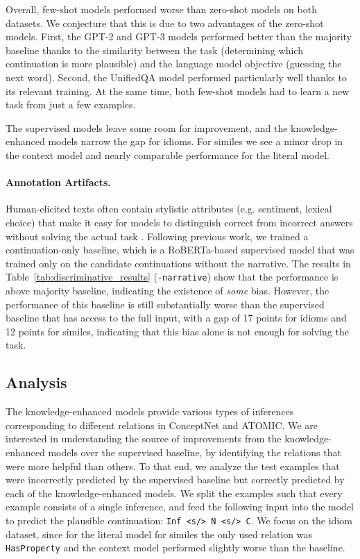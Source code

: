 Overall, few-shot models performed worse than zero-shot models on both datasets. We conjecture that this is due to two advantages of the zero-shot models. First, the GPT-2 and GPT-3 models performed better than the majority baseline thanks to the similarity between the task (determining which continuation is more plausible) and the language model objective (guessing the next word). Second, the UnifiedQA model performed particularly well thanks to its relevant training. At the same time, both few-shot models had to learn a new task from just a few examples.



The supervised models leave some room for improvement, and the knowledge-enhanced models narrow the gap for idioms. For similes we see a minor drop in the context model and nearly comparable performance for the literal model. 

\paragraph{Annotation Artifacts.} Human-elicited texts often contain stylistic attributes (e.g. sentiment, lexical choice) that make it easy for models to distinguish correct from incorrect answers without solving the actual task \cite{schwartz-etal-2017-effect,cai-etal-2017-pay,gururangan-etal-2018-annotation,poliak-etal-2018-hypothesis}. Following previous work, we trained a continuation-only baseline, which is a RoBERTa-based supervised model that was trained only on the candidate continuations without the narrative. The results in Table~\ref{tab:discriminative_results} (\texttt{-narrative}) show that the performance is above majority baseline, indicating the existence of \emph{some} bias. However, the performance of this baseline is still substantially worse than the supervised baseline that has access to the full input, with a gap of 17 points for idioms and 12 points for similes, indicating that this bias alone is not enough for solving the task. 


\subsection{Analysis}
\label{sec:disc:analysis}
 
The knowledge-enhanced models provide various types of inferences corresponding to different relations in ConceptNet and ATOMIC. We are interested in understanding the source of improvements from the knowledge-enhanced models over the supervised baseline, by identifying the relations that were more helpful than others. To that end, we analyze the test examples that were incorrectly predicted by the supervised baseline but correctly predicted by each of the knowledge-enhanced models. We split the examples such that every example consists of a single inference, and feed the following input into the model to predict the plausible continuation: \texttt{Inf <s/> N <s/> C}. We focus on the idiom dataset, since for the literal model for similes the only used relation was \texttt{HasProperty} and the context model performed slightly worse than the baseline. 

